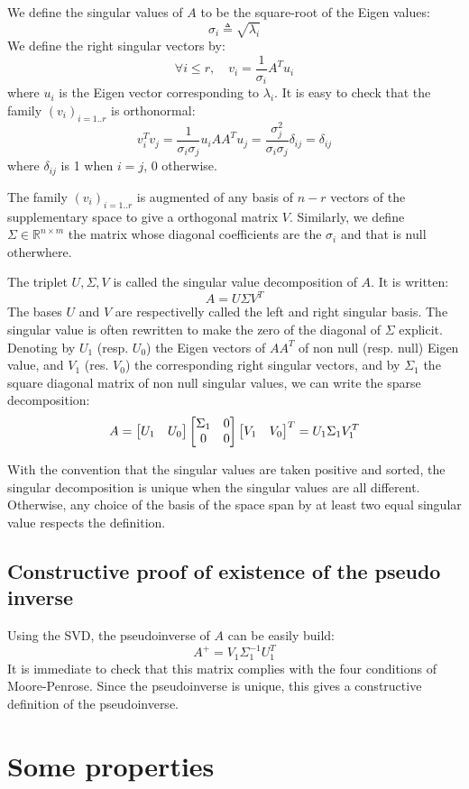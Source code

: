 \documentclass{book}
\begin{document}
We define the singular values of $A$ to be the square-root of the Eigen values:
\[ \sigma_i \triangleq \sqrt{\lambda_i} \]
We define the right singular vectors by:
\[ \forall i\leq r, \quad v_i = \frac{1}{\sigma_i} A^T u_i \]
where $u_i$ is the Eigen vector corresponding to $\lambda_i$. It is easy to check that the family $(v_i)_{i=1..r}$ is orthonormal:
\[ v_i^T v_j = \frac{1}{\sigma_i \sigma_j} u_i AA^T u_j = \frac{\sigma_j^2}{\sigma_i \sigma_j} \delta_{ij} = \delta_{ij} \]
where $\delta_{ij}$ is 1 when $i=j$, 0 otherwise.

The family $(v_i)_{i=1..r}$ is augmented of any basis of $n-r$ vectors of the supplementary space to give a orthogonal matrix $V$. Similarly, we define $\Sigma \in \mathbb{R}^{n \times m}$ the matrix whose diagonal coefficients are the $\sigma_i$ and that is null otherwhere.

The triplet $U,\Sigma,V$ is called the singular value decomposition of $A$. It is written:
\[ A = U \Sigma V^T\]
The bases $U$ and $V$ are respectivelly called the left and right singular basis. The singular value is often rewritten to make the zero of the diagonal of $\Sigma$ explicit. Denoting by $U_1$ (resp. $U_0$) the Eigen vectors of $AA^T$ of non null (resp. null) Eigen value, and $V_1$ (res. $V_0$) the corresponding right singular vectors, and by $\Sigma_1$ the square diagonal matrix of non null singular values, we can write the sparse decomposition:
\[ A = \begin{bmatrix} U_1 & U_0 \end{bmatrix} \begin{bmatrix} \Sigma_1 & 0 \\ 0 & 0 \end{bmatrix} \begin{bmatrix} V_1 & V_0 \end{bmatrix}^T = U_1 \Sigma_1 V_1^T \]

With the convention that the singular values are taken positive and sorted, the singular decomposition is unique when the singular values are all different. Otherwise, any choice of the basis of the space span by at least two equal singular value respects the definition.

\subsection{Constructive proof of existence of the pseudo inverse}

Using the SVD, the pseudoinverse of $A$ can be easily build:
$$ A^+ = V_1 \Sigma_1^{-1} U_1^T $$
It is immediate to check that this matrix complies with the four conditions of Moore-Penrose. Since the pseudoinverse is unique, this gives a constructive definition of the pseudoinverse.

\section{Some properties}
\end{document}
